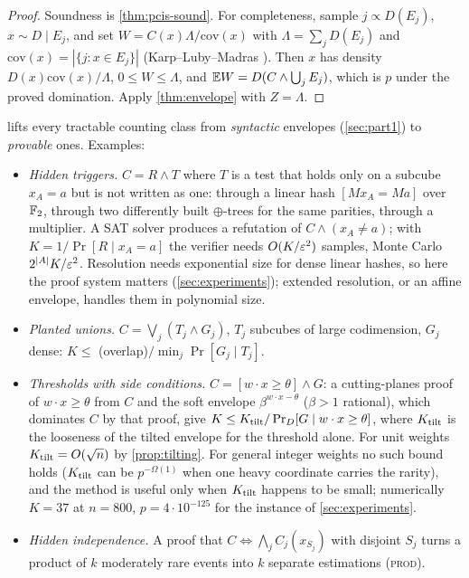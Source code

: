 \begin{proof}
Soundness is \cref{thm:pcis-sound}. For completeness, sample $j\propto
D(E_j)$, $x\sim D\mid E_j$, and set $W=C(x)\Lambda/\mathrm{cov}(x)$ with
$\Lambda=\sum_jD(E_j)$ and $\mathrm{cov}(x)=|\{j:x\in E_j\}|$ (Karp--Luby--Madras
\cite{klm1989}). Then $x$ has density $D(x)\mathrm{cov}(x)/\Lambda$, $0\le
W\le\Lambda$, and $\mathbb{E} W=D(C\wedge\bigcup_jE_j)$, which is $p$ under the proved
domination. Apply \cref{thm:envelope} with $Z=\Lambda$.
\end{proof}

 lifts every tractable counting class from \emph{syntactic}
envelopes (\cref{sec:part1}) to \emph{provable} ones. Examples:
\begin{itemize}
\item \emph{Hidden triggers.} $C=R\wedge T$ where $T$ is a test that holds only
on a subcube $x_A=a$ but is not written as one: through a linear hash $[Mx_A=Ma]$
over $\mathbb{F}_2$, through two differently built $\oplus$-trees for the same parities,
through a multiplier. A SAT solver produces a refutation of $C\wedge(x_A\ne a)$;
with $K=1/\Pr[R\mid x_A=a]$ the verifier needs $O(K/\varepsilon^2)$ samples, Monte
Carlo $2^{|A|}K/\varepsilon^2$. Resolution needs exponential size for dense linear
hashes, so here the proof system matters (\cref{sec:experiments}); extended
resolution, or an affine envelope, handles them in polynomial size.
\item \emph{Planted unions.} $C=\bigvee_j(T_j\wedge G_j)$, $T_j$ subcubes of
large codimension, $G_j$ dense: $K\le$ (overlap)$/\min_j\Pr[G_j\mid T_j]$.
\item \emph{Thresholds with side conditions.} $C=[w\cdot x\ge\theta]\wedge G$:
a cutting-planes proof of $w\cdot x\ge\theta$ from $C$ and the soft envelope
$\beta^{w\cdot x-\theta}$ ($\beta>1$ rational), which dominates $C$ by that
proof, give
$K\le K_{\rm tilt}/\Pr_D[G\mid w\cdot x\ge\theta]$, where $K_{\rm tilt}$ is the
looseness of the tilted envelope for the threshold alone. For unit weights
$K_{\rm tilt}=O(\sqrt n)$ by \cref{prop:tilting}. For general integer weights
no such bound holds ($K_{\rm tilt}$ can be $p^{-\Omega(1)}$ when one heavy
coordinate carries the rarity), and the method is useful only when
$K_{\rm tilt}$ happens to be small; numerically $K=37$ at $n=800$,
$p=4\cdot10^{-125}$ for the instance of \cref{sec:experiments}.
\item \emph{Hidden independence.} A proof that $C\Leftrightarrow\bigwedge_jC_j(x_{S_j})$
with disjoint $S_j$ turns a product of $k$ moderately rare events into $k$
separate estimations (\textsc{prod}).
\end{itemize}

